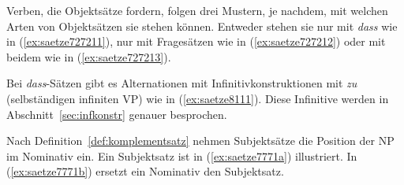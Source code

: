 Verben, die Objektsätze fordern, folgen drei Mustern, je nachdem, mit welchen Arten von Objektsätzen sie stehen können.
Entweder stehen sie nur mit \textit{dass} wie in (\ref{ex:saetze727211}), nur mit Fragesätzen wie in (\ref{ex:saetze727212}) oder mit beidem wie in (\ref{ex:saetze727213}).

\begin{exe}
  \ex\label{ex:saetze727211} 
  \begin{xlist}
  \end{xlist}
  \ex\label{ex:saetze727212} 
  \begin{xlist}
  \end{xlist}
  \ex\label{ex:saetze727213} 
  \begin{xlist}
  \end{xlist}
\end{exe}

Bei \textit{dass}-Sätzen gibt es Alternationen mit Infinitivkonstruktionen mit \textit{zu} (selbständigen infiniten VP) wie in (\ref{ex:saetze8111}).
Diese Infinitive werden in Abschnitt~\ref{sec:infkonstr} genauer besprochen.

\begin{exe}
  \ex\label{ex:saetze8111}
  \begin{xlist}
  \end{xlist}
\end{exe}

Nach Definition~\ref{def:komplementsatz} nehmen Subjektsätze die Position der NP im Nominativ ein.
Ein Subjektsatz ist in (\ref{ex:saetze7771a}) illustriert.
In (\ref{ex:saetze7771b}) ersetzt ein Nominativ den Subjektsatz.

\begin{exe}
  \ex\label{ex:saetze7771} 
  \begin{xlist}
  \end{xlist}
\end{exe}

